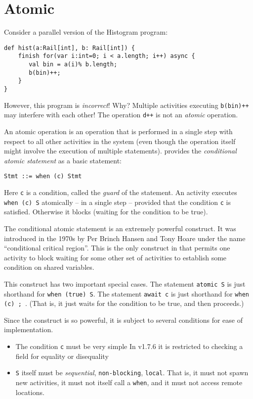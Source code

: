 \section{Atomic}\label{sec:atomic}


Consider a parallel version of the Histogram program:

{\footnotesize
\begin{verbatim}
def hist(a:Rail[int], b: Rail[int]) {
    finish for(var i:int=0; i < a.length; i++) async {
       val bin = a(i)% b.length;
       b(bin)++;
    }
}
\end{verbatim}}

However, this program is {\em incorrect}! Why? Multiple activities executing {\tt b(bin)++} may interfere with each other! The operation {\tt d++} is not an {\em atomic} operation.

An atomic operation is an operation that is performed in a single step with respect to all other activities in the system (even though the operation itself might involve the execution of multiple statements). \Xten{} provides the {\em conditional atomic statement} as a basic statement:
 
{\footnotesize
\begin{verbatim}
Stmt ::= when (c) Stmt  
\end{verbatim}}

Here {\tt c} is a condition, called the {\em guard} of the statement. An activity executes {\tt when (c) S} atomically -- in a single step -- provided that the condition {\tt c} is satisfied. Otherwise it blocks (waiting for the condition to be true).

The conditional atomic statement is an extremely powerful construct. It was introduced in the 1970s by Per Brinch Hansen and Tony Hoare under the name ``conditional critical region''. This is the only construct in \Xten{} that permits one activity to block waiting for some other set of activities to establish some condition on shared variables. 

This construct has two important special cases. The statement {\tt atomic S} is just shorthand for {\tt when (true) S}. The statement {\tt await c} is just shorthand for {\tt when (c) ; }. (That is, it just waits for the condition to be true, and then proceeds.)

Since the construct is so powerful, it is subject to several conditions for ease of implementation.
\begin{itemize}
  \item The condition {\tt c} must be very simple In \Xten{} v1.7.6 it is restricted to checking a field for equality or disequality
  \item {\tt S} itself must be {\em sequential}, {\tt non-blocking}, {\tt local}. That is, it must not spawn new activities, it must not itself call a {\tt when}, and it must not access remote locations.
\end{itemize}

